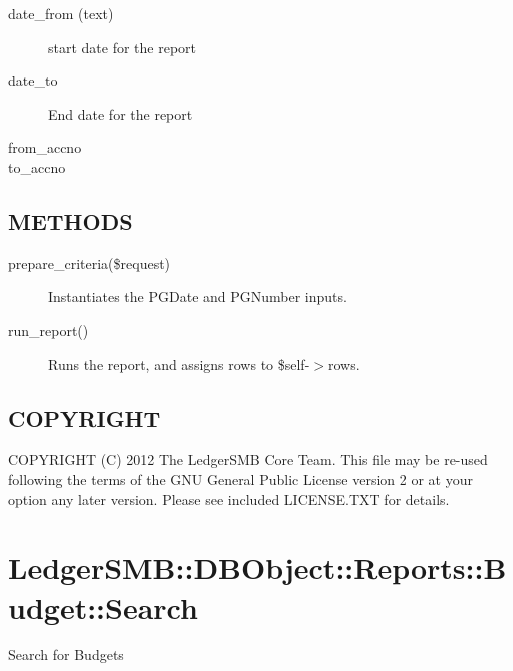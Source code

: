 \begin{description}
\begin{description}
\begin{description}
\begin{description}
\begin{description}
\begin{description}
\begin{description}
\begin{description}
\begin{description}
\begin{description}
\begin{description}
\item[{date\_from (text)}] \mbox{}

start date for the report


\item[{date\_to}] \mbox{}

End date for the report


\item[{from\_accno}] \mbox{}
\item[{to\_accno}] \mbox{}\end{description}
\subsection*{METHODS\label{LedgerSMB::DBObject::Report::co::Caja_Diaria_METHODS}}
\begin{description}

\item[{prepare\_criteria(\$request)}] \mbox{}

Instantiates the PGDate and PGNumber inputs.


\item[{run\_report()}] \mbox{}

Runs the report, and assigns rows to \$self-$>$rows.

\end{description}
\subsection*{COPYRIGHT\label{LedgerSMB::DBObject::Report::co::Caja_Diaria_COPYRIGHT}}


COPYRIGHT (C) 2012 The LedgerSMB Core Team.  This file may be re-used following
the terms of the GNU General Public License version 2 or at your option any
later version.  Please see included LICENSE.TXT for details.

\section{LedgerSMB::DBObject::Reports::Budget::Search\label{LedgerSMB::DBObject::Reports::Budget::Search}}


Search for Budgets


\end{description}
\end{description}
\end{description}
\end{description}
\end{description}
\end{description}
\end{description}
\end{description}
\end{description}
\end{description}
